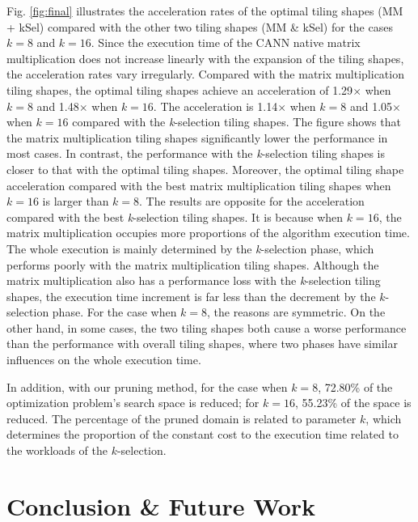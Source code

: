 \documentclass[12pt]{extbook}
\begin{document}
Fig. \ref{fig:final} illustrates the acceleration rates of the optimal tiling shapes (MM + kSel) compared with the other two tiling shapes (MM \& kSel) for the cases $k = 8$ and $k = 16$. Since the execution time of the CANN native matrix multiplication does not increase linearly with the expansion of the tiling shapes, the acceleration rates vary irregularly. Compared with the matrix multiplication tiling shapes, the optimal tiling shapes achieve an acceleration of 1.29$\times$ when $k = 8$ and 1.48$\times$ when $k = 16$. The acceleration is 1.14$\times$ when $k = 8$ and 1.05$\times$ when $k = 16$ compared with the \textit{k}-selection tiling shapes. The figure shows that the matrix multiplication tiling shapes significantly lower the performance in most cases. In contrast, the performance with the \textit{k}-selection tiling shapes is closer to that with the optimal tiling shapes. Moreover, the optimal tiling shape acceleration compared with the best matrix multiplication tiling shapes when $k = 16$ is larger than $k = 8$. The results are opposite for the acceleration compared with the best \textit{k}-selection tiling shapes. It is because when $k = 16$, the matrix multiplication occupies more proportions of the algorithm execution time. The whole execution is mainly determined by the \textit{k}-selection phase, which performs poorly with the matrix multiplication tiling shapes. Although the matrix multiplication also has a performance loss with the \textit{k}-selection tiling shapes, the execution time increment is far less than the decrement by the $k$-selection phase. For the case when $k = 8$, the reasons are symmetric. On the other hand, in some cases, the two tiling shapes both cause a worse performance than the performance with overall tiling shapes, where two phases have similar influences on the whole execution time.

In addition, with our pruning method, for the case when $k = 8$, 72.80\% of the optimization problem's search space is reduced; for $k = 16$, 55.23\% of the space is reduced. The percentage of the pruned domain is related to parameter $k$, which determines the proportion of the constant cost to the execution time related to the workloads of the $k$-selection.

\section{Conclusion \& Future Work}
\end{document}
